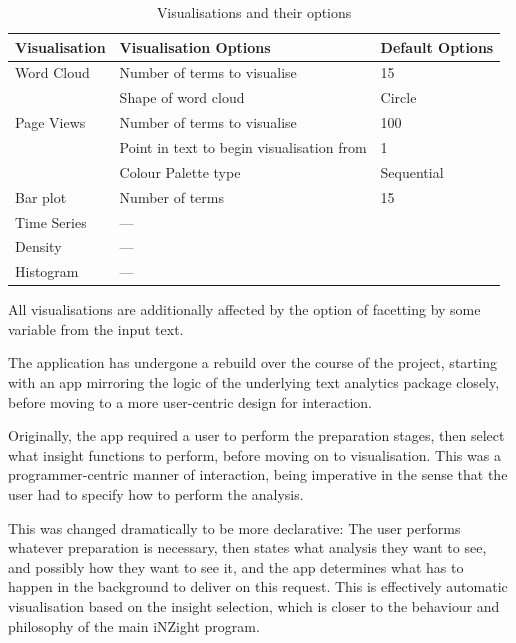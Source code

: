 \documentclass[11pt, a4paper, titlepage]{report}
\begin{document}
\begin{table} \centering
  \begin{tabular}{lll}
    \toprule
    Visualisation & Visualisation Options                     & Default Options \\
    \midrule
    Word Cloud    & Number of terms to visualise              & 15              \\
                  & Shape of word cloud                       & Circle          \\
    Page Views    & Number of terms to visualise              & 100             \\
                  & Point in text to begin visualisation from & 1               \\
                  & Colour Palette type                       & Sequential      \\
    Bar plot      & Number of terms                           & 15              \\
    Time Series   & ---                                       &                 \\
    Density       & ---                                       &                 \\
    Histogram     & ---                                       &                 \\
    \bottomrule
  \end{tabular}
  \caption{Visualisations and their options\label{tab:visopts}}
\end{table}

All visualisations are additionally affected by the option of facetting
by some variable from the input text.

The application has undergone a rebuild over the course of the
project, starting with an app mirroring the logic of the underlying
text analytics package closely, before moving to a more user-centric
design for interaction.

Originally, the app required a user to perform the preparation stages,
then select what insight functions to perform, before moving on to
visualisation. This was a programmer-centric manner of interaction,
being imperative in the sense that the user had to specify how to
perform the analysis.

This was changed dramatically to be more declarative: The user
performs whatever preparation is necessary, then states what analysis
they want to see, and possibly how they want to see it, and the app
determines what has to happen in the background to deliver on this
request. This is effectively automatic visualisation based on the
insight selection, which is closer to the behaviour and philosophy of
the main iNZight program.
\end{document}
